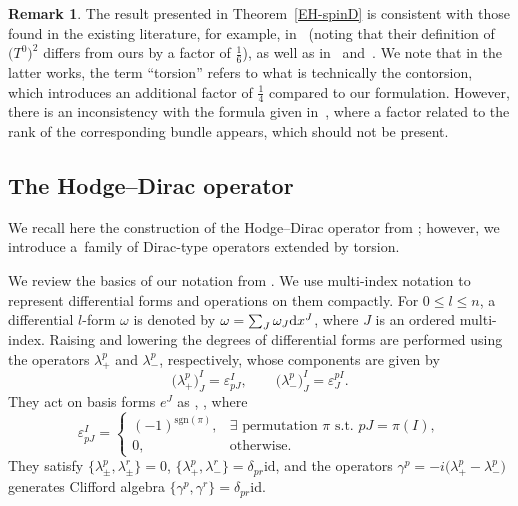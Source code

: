 \documentclass[10pt,a4paper]{amsart}
\numberwithin{equation}{section}
\theoremstyle{definition}
\newtheorem{Remark}[Theorem]{Remark}
\begin{document}
\begin{Remark}
The result presented in Theorem~\ref{EH-spinD} is consistent with those found in the existing literature, for example, in~\cite[p.~879]{hanisch10} (noting that their definition of $\bigl(T^0\bigr)^2$ differs from ours by a factor of $\frac{1}{6}$), as well as in~\cite[Proposition~5.4]{Pfaffle12} and~\cite[Section~5.2]{Kalau95}. We note that in the latter works, the term ``torsion'' refers to what is technically the contorsion, which introduces an additional factor of $\frac{1}{4}$ compared to our formulation.
However, there is an inconsistency with the formula given in~\cite[Lemma~3.1]{Ackermann96}, where a factor related to the rank of the corresponding bundle appears, which should not be present.
\end{Remark}

\subsection{The Hodge--Dirac operator}
We recall here the construction of the Hodge--Dirac operator from \cite{dabrowski2024a}; however, we introduce a~family of Dirac-type operators extended by torsion.

We review the basics of our notation from \cite{dabrowski2024a}. We use multi-index notation to represent differential forms and operations on them compactly. For $0\leq l\leq n$, a differential $l$-form $\omega$ is denoted by $\omega=\sum_{J} \omega_J {\rm d}x^J$, where $J$ is an ordered multi-index. Raising and lowering the degrees of differential forms are performed using the operators $\lambda^p_+$ and $\lambda_-^p$, respectively, whose components are given by
\[
 \bigl(\lambda^p_+\bigr)^I_J=\varepsilon^I_{pJ}, \qquad \bigl(\lambda^p_-\bigr)^I_J=\varepsilon^{pI}_J.
\]
They act on basis forms $e^J$ as
 ,
 ,
where
\[
 \varepsilon^{I}_{pJ}=\begin{cases}
 (-1)^{\mathrm{sgn}(\pi)}, & \exists \mbox{ permutation } \pi \mbox{ s.t. } pJ=\pi(I),\\
 0, & \mbox{otherwise}.
 \end{cases}
\]
They satisfy
$
 \bigl\{\lambda_\pm^p,\lambda_\pm^r\bigr\}=0$, $ \bigl\{\lambda^p_+,\lambda^r_-\bigr\}=\delta_{pr}\mathrm{id}$,
and the operators $\gamma^p=-i\bigl(\lambda^p_+-\lambda^p_-\bigr)$ generates Clifford algebra $\{\gamma^p,\gamma^r\}=\delta_{pr}\mathrm{id}$.
\end{document}
